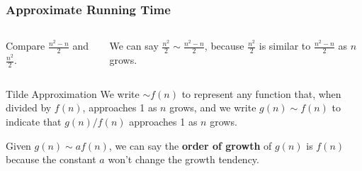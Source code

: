 \documentclass[aspectratio=169, 14pt]{beamer}
\begin{document}
\begin{frame}[fragile]
    \frametitle{Approximate Running Time}

    \begin{columns}
        Compare $\frac{n^2 - n}{2}$ and $\frac{n^2}{2}$.
        
        We can say \alert{$\frac{n^2}{2} \sim \frac{n^2 - n}{2}$}, because $\frac{n^2}{2}$ is similar to $\frac{n^2 - n}{2}$ as $n$ grows. 
    \end{columns}
\end{frame}

\begin{frame}[fragile]
\begin{exampleblock}{Tilde Approximation}
    We write $\sim f(n)$ to represent any function that, when divided by $f(n)$, approaches 1 as $n$ grows, and we write $g(n) \sim f(n)$ to indicate that $g(n)/f(n)$ approaches 1 as $n$ grows.
\end{exampleblock}    
\pause
Given $g(n)\sim af(n)$, we can say the \textbf{order of growth} of $g(n)$ is $f(n)$ because the constant $a$ won't change the growth tendency.
\end{frame}
\end{document}
